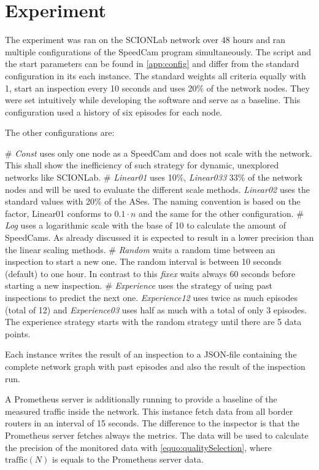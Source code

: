 \documentclass[thesis.tex]{subfiles}
\begin{document}
\section{Experiment}

The experiment was ran on the SCIONLab network over 48 hours and ran multiple configurations of the SpeedCam program simultaneously. The script and the start parameters can be found in \autoref{app:config} and differ from the standard configuration in its each instance. The standard weights all criteria equally with 1, start an inspection every 10 seconds and uses 20\% of the network nodes. They were set intuitively while developing the software and serve as a baseline. This configuration used a history of six episodes for each node.

The other configurations are:

\begin{easylist}
	\MyListProperties
	# \textit{Const} uses only one node as a SpeedCam and does not scale with the network. This shall show the inefficiency of such strategy for dynamic, unexplored networks like SCIONLab.
	# \textit{Linear01} uses 10\%, \textit{Linear033} 33\% of the network nodes and will be used to evaluate the different scale methods. \textit{Linear02} uses the standard values with 20\% of the ASes. The naming convention is based on the factor, Linear01 conforms to $0.1 \cdot n$ and the same for the other configuration.
	# \textit{Log} uses a logarithmic scale with the base of 10 to calculate the amount of SpeedCams. As already discussed it is expected to result in a lower precision than the linear scaling methods.
	# \textit{Random} waits a random time between an inspection to start a new one. The random interval is between 10 seconds (default) to one hour. In contrast to this \textit{fixex} waits always 60 seconds before starting a new inspection.
	# \textit{Experience} uses the strategy of using past inspections to predict the next one. \textit{Experience12} uses twice as much episodes (total of 12) and \textit{Experience03} uses half as much with a total of only 3 episodes. The experience strategy starts with the random strategy until there are 5 data points.		
\end{easylist}

Each instance writes the result of an inspection to a JSON-file containing the complete network graph with past episodes and also the result of the inspection run. 

A Prometheus server is additionally running to provide a baseline of the measured traffic inside the network. This instance fetch data from all border routers in an interval of 15 seconds. The difference to the inspector is that the Prometheus server fetches always the metrics. The data will be used to calculate the precision of the monitored data with \autoref{equo:qualitySelection}, where $\text{traffic}(N)$ is equals to the Prometheus server data. 
\end{document}
